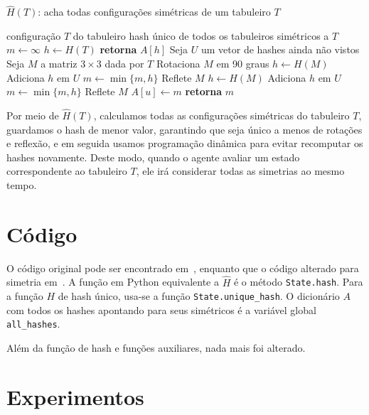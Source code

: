 \documentclass[12pt]{article}
\theoremstyle{plain}
\numberwithin{equation}{section}
\newcommand{\code}[1]{\lstinline[mathescape=true]{#1}}
\begin{document}
\begin{algorithm}[H]
  \caption*{$\hat{H}(T)$: acha todas configurações simétricas de um tabuleiro $T$\label{alg:sym}}
  \begin{algorithmic}[1]
    \Require configuração $T$ do tabuleiro
    \Ensure hash único de todos os tabuleiros simétricos a $T$
    \State $m\gets\infty$
    \State $h\gets H(T)$
      \State \textbf{retorna} $A[h]$
    \EndIf%
    \State Seja $U$ um vetor de hashes ainda não vistos
    \State Seja $M$ a matriz $3\times 3$ dada por $T$
      \State Rotaciona $M$ em 90 graus
      \State $h\gets H(M)$
        \State Adiciona $h$ em $U$
      \EndIf%
      \State $m\gets \min\{m,h\}$
      \State Reflete $M$
      \State $h\gets H(M)$
        \State Adiciona $h$ em $U$
      \EndIf%
      \State $m\gets \min\{m,h\}$
      \State Reflete $M$
    \EndFor%
      \State $A[u]\gets m$
    \EndFor%
    \State \textbf{retorna} $m$
  \end{algorithmic}
\end{algorithm}

Por meio de $\hat{H}(T)$, calculamos todas as configurações simétricas do tabuleiro $T$, guardamos
o hash de menor valor, garantindo que seja único a menos de rotações e reflexão, e em seguida
usamos programação dinâmica para evitar recomputar os hashes novamente. Deste modo, quando o agente
avaliar um estado correspondente ao tabuleiro $T$, ele irá considerar todas as simetrias ao mesmo
tempo.

\section{Código}

O código original pode ser encontrado em~\cite{ttt}, enquanto que o código alterado para simetria
em~\cite{mod-ttt}. A função em Python equivalente a $\hat{H}$ é o método \code{State.hash}. Para a
função $H$ de hash único, usa-se a função \code{State.unique_hash}. O dicionário $A$ com todos os
hashes apontando para seus simétricos é a variável global \code{all_hashes}.

Além da função de hash e funções auxiliares, nada mais foi alterado.

\section{Experimentos}
\end{document}
